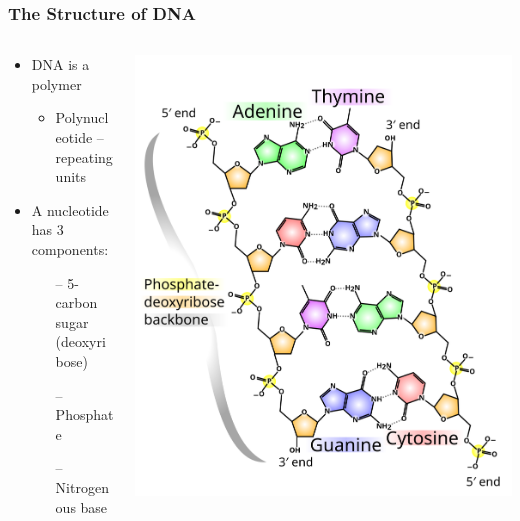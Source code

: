 \documentclass{beamer}
\begin{document}
	
	\begin{frame}
		\frametitle{The Structure of DNA}
		\begin{columns}
			\begin{column}{0.5\textwidth}
				
		\small		
				\begin{itemize}
	\item DNA is a polymer
					\begin{itemize}
		
						\item	Polynucleotide – repeating units
					\end{itemize}
	\item	A nucleotide has 3 components:
	\begin{itemize}
	
	\item[--] 5-carbon sugar (deoxyribose)
	\item[--] Phosphate 
	\item[--] Nitrogenous base 
\end{itemize}
\end{itemize}
					

			\end{column}
			\begin{column}{0.6\textwidth}
				\centering \includegraphics[keepaspectratio, width  =\textwidth]{img/DNA_chemistry}  
				
			\end{column}
		\end{columns}
	\end{frame}
	
\end{document}
